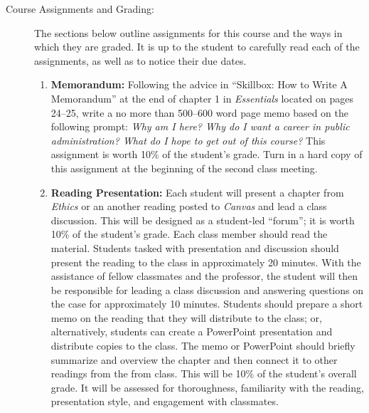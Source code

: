 \documentclass[11pt]{article}
\begin{document}
\begin{description}
	\item[Course Assignments and Grading:] The sections below outline assignments for this course and the ways in which they are graded. It is up to the student to carefully read each of the assignments, as well as to notice their due dates.
	\begin{enumerate}
		
		\item \textbf{Memorandum:} Following the advice in ``Skillbox: How to Write A Memorandum'' at the end of chapter 1 in \emph{Essentials} located on pages 24--25, write a no more than 500--600 word page memo based on the following prompt: \emph{Why am I here? Why do I want a career in public administration? What do I hope to get out of this course?} This assignment is worth 10\% of the student's grade. Turn in a hard copy of this assignment at the beginning of the second class meeting.
		
		\item \textbf{Reading Presentation:} Each student will present a chapter from \emph{Ethics} or an another reading posted to \emph{Canvas} and lead a class discussion. This will be designed as a student-led ``forum''; it is worth 10\% of the student's grade. Each class member should read the material. Students tasked with presentation and discussion should present the reading to the class in approximately 20 minutes. With the assistance of fellow classmates and the professor, the student will then be responsible for leading a class discussion and answering questions on the case for approximately 10 minutes. Students should prepare a short memo on the reading that they will distribute to the class; or, alternatively, students can create a PowerPoint presentation and distribute copies to the class. The memo or PowerPoint should briefly summarize and overview the chapter and then connect it to other readings from the from class. This will be 10\% of the student's overall grade. It will be assessed for thoroughness, familiarity with the reading, presentation style, and engagement with classmates.
		

\end{enumerate}
\end{description}
\end{document}
